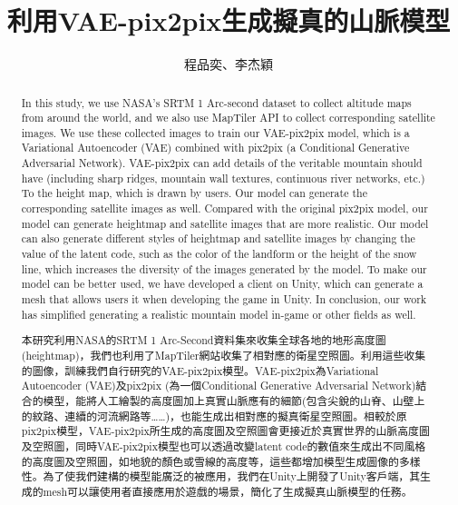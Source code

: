 \documentclass[a4paper, 12pt]{article}
\title{利用VAE-pix2pix生成擬真的山脈模型}
\author{程品奕、李杰穎}
\begin{document}

\tableofcontents
\newpage

\begin{abstract}
    In this study, we use NASA's SRTM 1 Arc-second dataset to collect altitude maps from around the world, and we also use MapTiler API to collect corresponding satellite images. We use these collected images to train our VAE-pix2pix model, which is a Variational Autoencoder (VAE) combined with pix2pix (a Conditional Generative Adversarial Network). VAE-pix2pix can add details of the veritable mountain should have (including sharp ridges, mountain wall textures, continuous river networks, etc.) To the height map, which is drawn by users. Our model can generate the corresponding satellite images as well. Compared with the original pix2pix model, our model can generate heightmap and satellite images that are more realistic. Our model can also generate different styles of heightmap and satellite images by changing the value of the latent code, such as the color of the landform or the height of the snow line, which increases the diversity of the images generated by the model. To make our model can be better used, we have developed a client on Unity, which can generate a mesh that allows users it when developing the game in Unity. In conclusion, our work has simplified generating a realistic mountain model in-game or other fields as well.
\end{abstract}

\renewcommand{\abstractname}{摘要}
\begin{abstract}
    本研究利用NASA的SRTM 1 Arc-Second資料集\cite{srtm1arc}來收集全球各地的地形高度圖(heightmap)，我們也利用了MapTiler網站收集了相對應的衛星空照圖。利用這些收集的圖像，訓練我們自行研究的VAE-pix2pix模型。VAE-pix2pix為Variational Autoencoder (VAE)及pix2pix (為一個Conditional Generative Adversarial Network)結合的模型，能將人工繪製的高度圖加上真實山脈應有的細節(包含尖銳的山脊、山壁上的紋路、連續的河流網路等……)，也能生成出相對應的擬真衛星空照圖。相較於原pix2pix模型，VAE-pix2pix所生成的高度圖及空照圖會更接近於真實世界的山脈高度圖及空照圖，同時VAE-pix2pix模型也可以透過改變latent code的數值來生成出不同風格的高度圖及空照圖，如地貌的顏色或雪線的高度等，這些都增加模型生成圖像的多樣性。為了使我們建構的模型能廣泛的被應用，我們在Unity上開發了Unity客戶端，其生成的mesh可以讓使用者直接應用於遊戲的場景，簡化了生成擬真山脈模型的任務。
\end{abstract}

\newpage
{}
\end{document}
